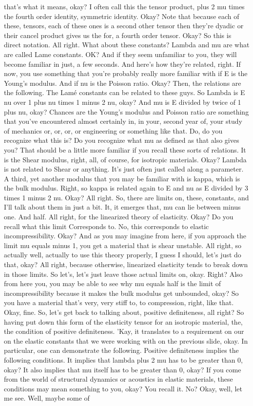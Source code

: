 \documentclass[10pt]{article}
\begin{document}
that's what it means, okay? I often call this the tensor product, plus 2 mu times the fourth order identity, symmetric identity. Okay? Note that because each of these, tensors, each of these ones is a second other tensor then they're dyadic or their cancel product gives us the for, a fourth order tensor. Okay? So this is direct notation. All right. What about these constants? Lambda and mu are what are called Lame constants. OK? And if they seem unfamiliar to you, they will become familiar in just, a few seconds. And here's how they're related, right. If now, you use something that you're probably really more familiar with if E is the Young's modulus. And if nu is the Poisson ratio. Okay? Then, the relations are the following. The Lamé constants can be related to these guys. So Lambda is E nu over 1 plus nu times 1 minus 2 nu, okay? And mu is E divided by twice of 1 plus nu, okay? Chances are the Young's modulus and Poisson ratio are something that you've encountered almost certainly in, in your, second year of, your study of mechanics or, or, or, or engineering or something like that. Do, do you recognize what this is? Do you recognize what mu as defined as that also gives you? That should be a little more familiar if you recall these sorts of relations. It is the Shear modulus, right, all, of course, for isotropic materials. Okay? Lambda is not related to Shear or anything. It's just often just called along a parameter. A third, yet another modulus that you may be familiar with is kappa, which is the bulk modulus. Right, so kappa is related again to E and nu as E divided by 3 times 1 minus 2 nu. Okay? All right.  So, there are limits on, these, constants, and I'll talk about them in just a bit. It, it emerges that, mu can lie between minus one. And half.  All right, for the linearized theory of elasticity. Okay? Do you recall what this limit Corresponds to. No, this corresponds to elastic incompressibility. Okay? And as you may imagine from here, if you approach the limit mu equals minus 1, you get a material that is shear unstable. All right, so actually well, actually to use this theory properly, I guess I should, let's just do that, okay? All right, because otherwise, linearized elasticity tends to break down in those limits. So let's, let's just leave those actual limits on, okay. Right? Also from here you, you may be able to see why mu equals half is the limit of incompressibility because it makes the bulk modulus get unbounded, okay? So you have a material that's very, very stiff to, to compression, right, like that. Okay, fine. So, let's get back to talking about, positive definiteness, all right? So having put down this form of the elasticity tensor for an isotropic material, the, the condition of positive definiteness. 'Kay, it translates to a requirement on our on the elastic constants that we were working with on the previous slide, okay. In particular, one can demonstrate the following. Positive definiteness implies the following conditions. It implies that lambda plus 2 mu has to be greater than 0, okay? It also implies that mu itself has to be greater than 0, okay? If you come from the world of structural dynamics or acoustics in elastic materials, these conditions may mean something to you, okay? You recall it. No? Okay, well, let me see. Well, maybe some of 
\end{document}
